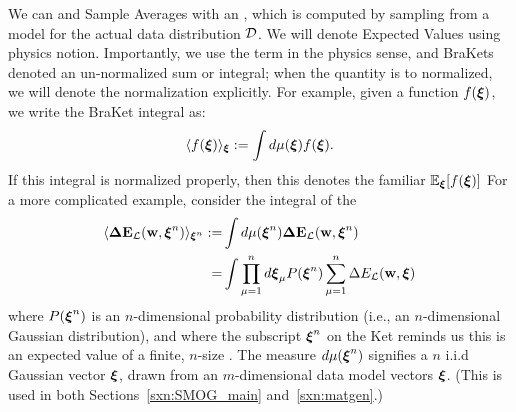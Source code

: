 We can \ModelSamples and Sample Averages with an \emph{\ExpectedValue}, 
which is computed by sampling from a model for the actual data distribution $\mathcal{D}$.   
We will denote Expected Values using physics \BraKet notion.  
 Importantly, we use the term \ExpectedValue in the physics sense, and BraKets denoted an un-normalized sum or integral; when the quantity is  to normalized, we will denote the normalization explicitly.
For example, given a function $f(\boldsymbol{\xi})$, 
we write the BraKet integral as:
\begin{align}
 \label{eqn:EuT}
 \langle f(\boldsymbol{\xi}) \rangle_{\boldsymbol{\xi}}:=\int d\mu(\boldsymbol{\xi}) f(\boldsymbol{\xi})  .
\end{align}
If  this integral is normalized properly, then this denotes the familiar \ExpectedValue $\mathbb{E}_{\boldsymbol{\xi}}[f(\boldsymbol{\xi})]$
For a more complicated example, consider the integral of the
\emph{\TotalDataSampleError}
\begin{align}
  \label{eqn:total_data_sample_error}
\nonumber
  \langle \mathbf{\Delta {E}}_{\mathcal{L}}(\mathbf{w}, \boldsymbol{\xi}^{n})\rangle_{\boldsymbol{\xi}^{n}}
  :=  &\int d\mu(\boldsymbol{\xi}^{n}) \mathbf{\Delta {E}}_{\mathcal{L}}(\mathbf{w}, \boldsymbol{\xi}^{n}) \\ 
   = & \int \prod_{\mu=1}^{n}d\boldsymbol{\xi}_{\mu}P(\boldsymbol{\xi}^{n}) \sum_{\mu=1}^{n}\Delta E_{\mathcal{L}}(\mathbf{w},\boldsymbol{\xi})
\end{align}
where $P(\boldsymbol{\xi}^{n})$ is an $n$-dimensional
probability distribution (i.e., an $n$-dimensional Gaussian distribution),
and where the subscript $\boldsymbol{\xi}^{n}$ on the Ket reminds us this is an expected value of a finite, $n$-size \ModelSample.
The measure $d\mu(\boldsymbol{\xi}^{n})$ signifies a $n$ i.i.d Gaussian vector $\boldsymbol{\xi}$, drawn from an $m$-dimensional data model vectors $\boldsymbol{\xi}$.
(This is used in both Sections~\ref{sxn:SMOG_main} and~\ref{sxn:matgen}.)
%

